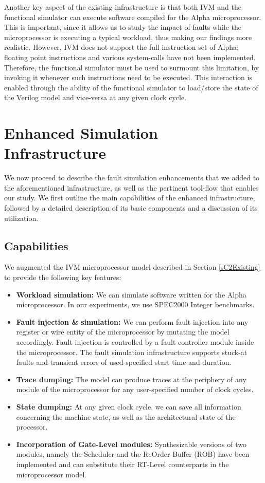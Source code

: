 \documentclass[12pt]{yalephd}
\begin{document}
Another key aspect of the existing infrastructure is that both IVM and the functional simulator can execute software compiled for the Alpha microprocessor. This is important, since it allows us to study the impact of faults while the microprocessor is executing a typical workload, thus making our findings more realistic. However, IVM does not support the full instruction set of Alpha; floating point instructions and various system-calls have not been implemented. Therefore, the functional simulator must be used to surmount this limitation, by invoking it whenever such instructions need to be executed. This interaction is enabled through the ability of the functional simulator to load/store the state of the Verilog model and vice-versa at any given clock cycle.

\section{Enhanced Simulation Infrastructure} \label{sC2Developed}
We now proceed to describe the fault simulation enhancements that we added to the aforementioned infrastructure, as well as the pertinent tool-flow that enables our study. We first outline the main capabilities of the enhanced infrastructure, followed by a detailed description of its basic components and a discussion of its utilization.

\subsection{Capabilities}

We augmented the IVM microprocessor model described in Section \ref{sC2Existing} to provide the following key features:
\begin{itemize}
\item {\bf Workload simulation:} We can simulate software written for the Alpha microprocessor. In our experiments, we use SPEC2000 Integer benchmarks.
\item  {\bf Fault injection \& simulation:} We can perform fault injection into any register or wire entity of the microprocessor by mutating the model accordingly. Fault injection is controlled by a fault controller module inside the microprocessor. The fault simulation infrastructure supports stuck-at faults and transient errors of used-specified start time and duration.
\item {\bf Trace dumping:} The model can produce traces at the periphery of any module of the microprocessor for any user-specified number of clock cycles.
\item {\bf State dumping:} At any given clock cycle, we can save all information concerning the machine state, as well as the architectural state of the processor.
\item {\bf Incorporation of Gate-Level modules:} Synthesizable versions of two modules, namely the Scheduler and the ReOrder Buffer (ROB) have been implemented and can substitute their RT-Level counterparts in the microprocessor model.
\end{itemize}
\end{document}
